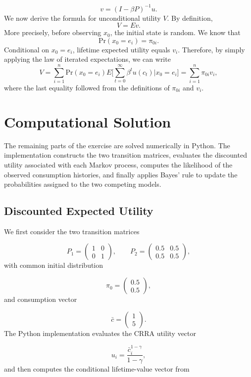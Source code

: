 \documentclass[11pt]{article}
\begin{document}
\[
v=(I-\beta P)^{-1}u.
\]
We now derive the formula for unconditional utility \(V\). By definition,
\[
V = Ev.
\]
More precisely, before observing \(x_0\), the initial state is random. We know that
\[
\text{Pr}(x_0=e_i)=\pi_{0i}.
\]
Conditional on \(x_0=e_i\), lifetime expected utility equals \(v_i\). Therefore, by simply applying the law of iterated expectations, we can write
\[
V=\sum_{i=1}^n\text{Pr}(x_0=e_i)E\bigg[\sum_{t=0}^\infty \beta^tu(c_t)|x_0=e_i \bigg]= \sum_{i=1}^n\pi_{0i}v_i,
\]
where the last equality followed from the definitions of \(\pi_{0i}\) and \(v_i\).

\section*{Computational Solution}

The remaining parts of the exercise are solved numerically in Python. The
implementation constructs the two transition matrices, evaluates the discounted
utility associated with each Markov process, computes the likelihood of the
observed consumption histories, and finally applies Bayes' rule to update the
probabilities assigned to the two competing models.

\subsection*{Discounted Expected Utility}

We first consider the two transition matrices

\[
P_1=
\begin{pmatrix}
1 & 0\\
0 & 1
\end{pmatrix},
\qquad
P_2=
\begin{pmatrix}
0.5 & 0.5\\
0.5 & 0.5
\end{pmatrix},
\]
with common initial distribution

\[
\pi_0=
\begin{pmatrix}
0.5\\
0.5
\end{pmatrix},
\]
and consumption vector

\[
\bar c=
\begin{pmatrix}
1\\
5
\end{pmatrix}.
\]
The Python implementation evaluates the CRRA utility vector

\[
u_i=\frac{\bar c_i^{1-\gamma}}{1-\gamma},
\]
and then computes the conditional lifetime-value vector from
\end{document}
